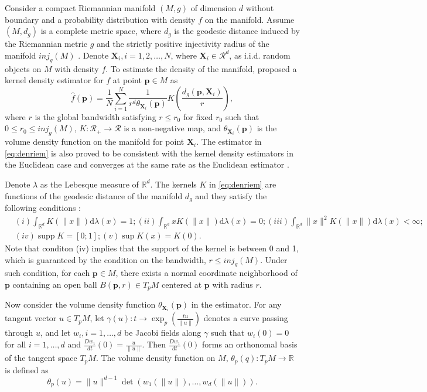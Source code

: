 \documentclass[11pt,a4paper,]{article}
\DeclareMathOperator\supp{supp}
\begin{document}
Consider a compact Riemannian manifold \((M, g)\) of dimension \(d\) without boundary and a probability distribution with density \(f\) on the manifold. Assume \((M, d_g)\) is a complete metric space, where \(d_g\) is the geodesic distance induced by the Riemannian metric \(g\) and the strictly positive injectivity radius of the manifold \(inj_g(M)\) \autocite{Chavel2006-mp}. Denote \(\pmb{X}_i, i = 1, 2, \dots, N\), where \(\pmb{X}_i \in \mathcal{R}^d\), as i.i.d. random objects on \(M\) with density \(f\). To estimate the density of the manifold, \textcite{Pelletier2005-vu} proposed a kernel density estimator for \(f\) at point \(\pmb{p}\in M\) as
\begin{equation}
\label{eq:denriem}
\hat{f}(\pmb{p}) = \frac{1}{N} \sum_{i=1}^{N} \frac{1}{r^d \theta_{\pmb{X}_i}(\pmb{p})} K(\frac{d_g(\pmb{p}, \pmb{X}_i)}{r}),
\end{equation}
where \(r\) is the global bandwidth satisfying \(r \leq r_0\) for fixed \(r_0\) such that \(0\leq r_0\leq inj_g(M)\), \(K: \mathcal{R}_{+} \rightarrow \mathcal{R}\) is a non-negative map, and \(\theta_{\pmb{X}_i}(\pmb{p})\) is the volume density function on the manifold for point \(\pmb{X}_i\). The estimator in \eqref{eq:denriem} is also proved to be consistent with the kernel density estimators in the Euclidean case and converges at the same rate as the Euclidean estimator \autocite{Henry2009-ll}.

Denote \(\lambda\) as the Lebesque measure of \(\mathbb{R}^d\). The kernels \(K\) in \eqref{eq:denriem} are functions of the geodesic distance of the manifold \(d_g\) and they satisfy the following conditions \autocite{Pelletier2005-vu}:
\begin{align}
& (i) \int_{\mathbb{R}^{d}} K(\|x\|) \mathrm{d} \lambda(x)=1;
(ii) \int_{\mathbb{R}^{d}} x K(\|x\|) \mathrm{d} \lambda(x)=0;
(iii) \int_{\mathbb{R}^{d}}\|x\|^{2} K(\|x\|) \mathrm{d} \lambda(x)<\infty; \\
& (iv) \supp K=[0; 1];
(v) \sup K(x)=K(0).
\end{align}
Note that conditon (iv) implies that the support of the kernel is between 0 and 1, which is guaranteed by the condition on the bandwidth, \(r\leq inj_g(M)\). Under such condition, for each \(\pmb{p} \in M\), there exists a normal coordinate neighborhood of \(\pmb{p}\) containing an open ball \(B(\pmb{p}, r) \in T_pM\) centered at \(\pmb{p}\) with radius \(r\).

Now consider the volume density function \(\theta_{\pmb{X}_i}(\pmb{p})\) in the estimator.
For any tangent vector \(u \in T_pM\), let \(\gamma(u): t \rightarrow \exp_p(\frac{tu}{\|u\|})\) denotes a curve passing through \(u\), and let \(w_i, i=1,\dots,d\) be Jacobi fields along \(\gamma\) such that \(w_i(0)=0\) for all \(i=1,\dots,d\) and \(\frac{Dw_1}{dt}(0)=\frac{u}{\|u\|}\). Then \(\frac{Dw_1}{dt}(0)\) forms an orthonomal basis of the tangent space \(T_pM\).
The volume density function on \(M\), \(\theta_p(q): T_pM \rightarrow \mathbb{R}\) is defined as
\[
\theta_p(u) = \|u\|^{d-1} \det(w_1(\|u\|),\dots,w_d(\|u\|)).
\]
\end{document}
